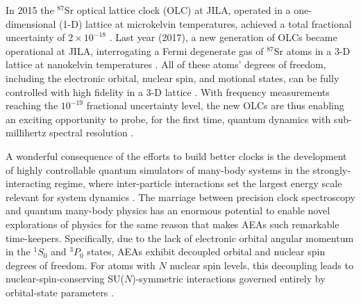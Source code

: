 \documentclass[preprint,showkeys,nofootinbib]{revtex4-1}
\newcommand{\1}{\mathds{1}}
\begin{document}
In 2015 the ${}^{87}$Sr optical lattice clock (OLC) at JILA, operated
in a one-dimensional (1-D) lattice at microkelvin temperatures,
achieved a total fractional uncertainty of $2\times10^{-18}$
\cite{bloom2014optical, nicholson2015systematic}.  Last year (2017), a
new generation of OLCs became operational at JILA, interrogating a
Fermi degenerate gas of ${}^{87}$Sr atoms in a 3-D lattice at
nanokelvin temperatures \cite{campbell2017fermidegenerate}.  All of
these atoms' degrees of freedom, including the electronic orbital,
nuclear spin, and motional states, can be fully controlled with high
fidelity in a 3-D lattice \cite{daley2008quantum,
  gorshkov2009alkalineearthmetal, daley2011quantum,
  daley2011statedependent}.  With frequency measurements reaching the
$10^{-19}$ fractional uncertainty level, the new OLCs are thus
enabling an exciting opportunity to probe, for the first time, quantum
dynamics with sub-millihertz spectral resolution
\cite{campbell2017fermidegenerate}.

A wonderful consequence of the efforts to build better clocks is the
development of highly controllable quantum simulators of many-body
systems in the strongly-interacting regime, where inter-particle
interactions set the largest energy scale relevant for system dynamics
\cite{swallows2011suppression, lemke2011wave,
  campbell2017fermidegenerate}.  The marriage between precision clock
spectroscopy and quantum many-body physics \cite{taie2012su,
  martin2013quantum, scazza2014observation, cappellini2014direct,
  zhang2014spectroscopic, rey2014probing} has an enormous potential to
enable novel explorations of physics for the same reason that makes
AEAs such remarkable time-keepers.  Specifically, due to the lack of
electronic orbital angular momentum in the ${}^1S_0$ and ${}^3P_0$
states, AEAs exhibit decoupled orbital and nuclear spin degrees of
freedom.  For atoms with $N$ nuclear spin levels, this decoupling
leads to nuclear-spin-conserving SU($N$)-symmetric interactions
governed entirely by orbital-state parameters
\cite{cazalilla2009ultracold, taie2012su, zhang2014spectroscopic}.
\end{document}
